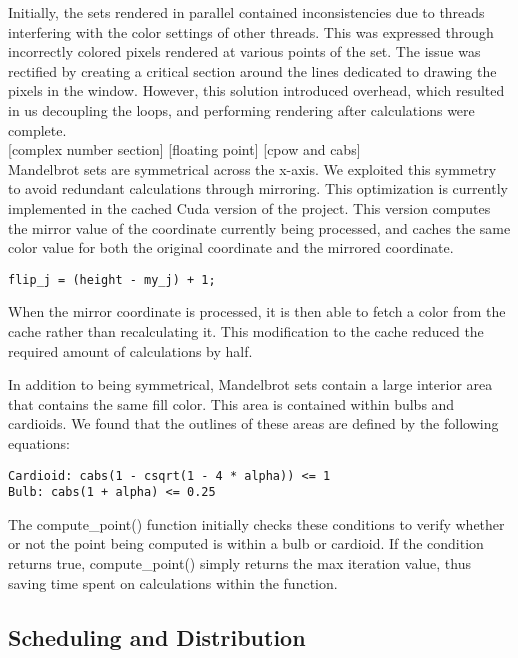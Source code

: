 \documentclass{article}
\begin{document}
Initially, the sets rendered in parallel contained inconsistencies due to threads interfering with the color settings of other threads. This was expressed through incorrectly colored pixels rendered at various points of the set. The issue was rectified by creating a critical section around the lines dedicated to drawing the pixels in the window. However, this solution introduced overhead, which resulted in us decoupling the loops, and performing rendering after calculations were complete. \\

[complex number section] [floating point] [cpow and cabs]\\

Mandelbrot sets are symmetrical across the x-axis. We exploited this symmetry to avoid redundant calculations through mirroring. This optimization is currently implemented in the cached Cuda version of the project. This version computes the mirror value of the coordinate currently being processed, and caches the same color value for both the original coordinate and the mirrored coordinate. \\

\begin{verbatim}
flip_j = (height - my_j) + 1;
\end{verbatim}

When the mirror coordinate is processed, it is then able to fetch a color from the cache rather than recalculating it. This modification to the cache reduced the required amount of calculations by half.

In addition to being symmetrical, Mandelbrot sets contain a large interior area that contains the same fill color. This area is contained within bulbs and cardioids. We found that the outlines of these areas are defined by the following equations:

\begin{verbatim}
Cardioid: cabs(1 - csqrt(1 - 4 * alpha)) <= 1
Bulb: cabs(1 + alpha) <= 0.25
\end{verbatim}

The compute\_point() function initially checks these conditions to verify whether or not the point being computed is within a bulb or cardioid. If the condition returns true, compute\_point() simply returns the max iteration value, thus saving time spent on calculations within the function.

\subsection{Scheduling and Distribution}
\end{document}
